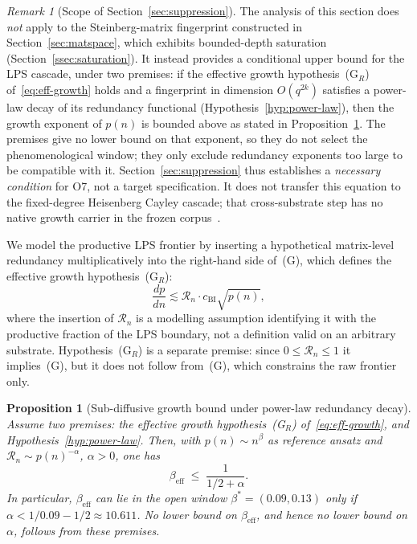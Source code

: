 \documentclass[11pt]{article}
\newtheorem{proposition}[theorem]{Proposition}
\theoremstyle{definition}
\theoremstyle{remark}
\newtheorem{remark}[theorem]{Remark}
\newcommand{\beff}{\beta_{\mathrm{eff}}}
\newcommand{\Rn}{\mathcal{R}_n}
\begin{document}
    \begin{remark}[Scope of Section~\ref{sec:suppression}]
      \label{rem:section4-scope}
      The analysis of this section does \emph{not} apply to the Steinberg-matrix fingerprint
      constructed in Section~\ref{sec:matspace}, which exhibits bounded-depth saturation
      (Section~\ref{ssec:saturation}).
      It instead provides a conditional upper bound for the LPS cascade, under two premises:
      if the effective growth hypothesis~(G$_R$) of~\eqref{eq:eff-growth} holds and a fingerprint in
      dimension $O(q^{2k})$ satisfies a power-law decay of its redundancy functional
      (Hypothesis~\ref{hyp:power-law}), then the growth exponent of $p(n)$ is bounded above as stated
      in Proposition~\ref{prop:beta-eff}.
      The premises give no lower bound on that exponent, so they do not select the phenomenological
      window; they only exclude redundancy exponents too large to be compatible with it.
      Section~\ref{sec:suppression} thus establishes a \emph{necessary condition} for O7, not a
      target specification.
      It does not transfer this equation to the fixed-degree Heisenberg Cayley cascade; that
      cross-substrate step has no native growth carrier in the frozen corpus~\cite{Beau2026sgn}.
    \end{remark}

    We model the productive LPS frontier by inserting a hypothetical matrix-level redundancy
    multiplicatively into the right-hand side of~(G), which defines the effective growth
    hypothesis~(G$_R$):
    \begin{equation}
      \label{eq:eff-growth}
      \frac{dp}{dn} \lesssim \Rn \cdot c_{\mathrm{BI}} \sqrt{p(n)},
    \end{equation}
    where the insertion of $\Rn$ is a modelling assumption identifying it with the productive
    fraction of the LPS
    boundary, not a definition valid on an arbitrary substrate.
    Hypothesis~(G$_R$) is a separate premise: since $0 \leq \Rn \leq 1$ it implies~(G), but it does
    not follow from~(G), which constrains the raw frontier only.

    \begin{proposition}[Sub-diffusive growth bound under power-law redundancy decay]
      \label{prop:beta-eff}
      Assume two premises: the effective growth hypothesis~(G$_R$) of~\eqref{eq:eff-growth}, and
      Hypothesis~\ref{hyp:power-law}.
      Then,
      with $p(n) \sim n^\beta$ as reference ansatz and $\Rn \sim p(n)^{-\alpha}$, $\alpha > 0$, one has
      \begin{equation}
        \label{eq:beta-eff-formula}
        \beff \;\leq\; \frac{1}{1/2 + \alpha}.
      \end{equation}
      In particular, $\beff$ can lie in the open window $\beta^* = (0.09, 0.13)$ only if
      $\alpha < 1/0.09 - 1/2 \approx 10.611$.
      No lower bound on $\beff$, and hence no lower bound on $\alpha$, follows from these premises.
    \end{proposition}
\end{document}
